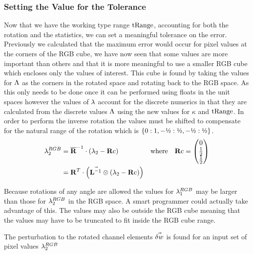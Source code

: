 \subsubsection{Setting the Value for the Tolerance}
Now that we have the working type range $\text{tRange}$, accounting for both the rotation and the statistics, we can set a meaningful tolerance on the error. Previously we calculated that the maximum error would occur for pixel values at the corners of the RGB cube, we have now seen that some values are more important than others and that it is more meaningful to use a smaller RGB cube which encloses only the values of interest. This cube is found by taking the values for $\Lambda$ as the corners in the rotated space and rotating back to the RGB space. As this only needs to be done once it can be performed using floats in the unit spaces however the values of $\lambda$ account for the discrete numerics in that they are calculated from the discrete values $\Lambda$ using the new values for $\kappa$ and $\text{tRange}$. In order to perform the inverse rotation the values must be shifted to compensate for the natural range of the rotation which is $\{0:1,-\text{\textonehalf}:\text{\textonehalf},-\text{\textonehalf}:\text{\textonehalf}\}$. 
\newcommand{\Rc}{\mathbf{R}\text{c}}
\begin{align}
\discard^{RGB}_2 &= \nR^{-1} \cdot \left( \discard_2 - \Rc
        \right) & \text{where} \quad \Rc=\begin{pmatrix}
                 0   \\
                 \frac{1}{2}    \\
                 \frac{1}{2}     \\
                \end{pmatrix} \\
&= \R^{T} \cdot \left( \nS \otimes \left( \discard_2 - \Rc
                \right) \right)  
\end{align}

Because rotations of any angle are allowed the values for $\lambda^{RGB}_1$ may be larger than those for $\lambda^{RGB}_2$ in the RGB space. A smart programmer could actually take advantage of this. The values may also be outside the RGB cube meaning that the values may have to be truncated to fit inside the RGB cube range. 

The perturbation to the rotated channel elements $\vec{\delta w}$ is found for an input set of pixel values $\lambda^{RGB}_2$

